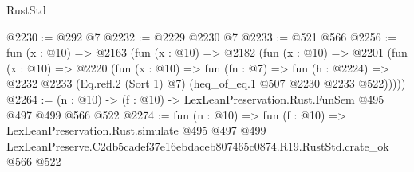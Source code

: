 \begin{lexlean}{RustStd}
\begin{coremodule}
@2230 := @292 @7
@2232 := @2229 @2230 @7
@2233 := @521 @566
@2256 := fun (x : @10) =>
  @2163
    (fun (x : @10) =>
    @2182
      (fun (x : @10) =>
      @2201
        (fun (x : @10) =>
        @2220
          (fun (x : @10) =>
          fun (fn : @7) =>
          fun (h : @2224) =>
          @2232 @2233 (Eq.refl.{2} (Sort 1) @7) (heq_of_eq.{1} @507 @2230 @2233 @522)))))
@2264 := (n : @10) -> (f : @10) -> LexLeanPreservation.Rust.FunSem @495 @497 @499 @566 @522
@2274 := fun (n : @10) =>
  fun (f : @10) =>
  LexLeanPreservation.Rust.simulate
    @495
    @497
    @499
    LexLeanPreserve.C2db5cadef37e16ebdaceb807465c0874.R19.RustStd.crate_ok
    @566
    @522
\end{coremodule}
\end{lexlean}
